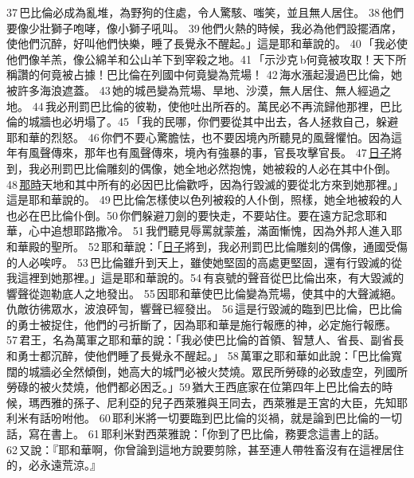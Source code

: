 37 巴比倫必成為亂堆，為野狗的住處，令人驚駭、嗤笑，並且無人居住。 38 他們要像少壯獅子咆哮，像小獅子吼叫。 39 他們火熱的時候，我必為他們設擺酒席，使他們沉醉，好叫他們快樂，睡了長覺永不醒起。」這是耶和華說的。 40 「我必使他們像羊羔，像公綿羊和公山羊下到宰殺之地。41 「示沙克 b何竟被攻取！天下所稱讚的何竟被占據！巴比倫在列國中何竟變為荒場！ 42 海水漲起漫過巴比倫，她被許多海浪遮蓋。 43 她的城邑變為荒場、旱地、沙漠，無人居住、無人經過之地。 44 我必刑罰巴比倫的彼勒，使他吐出所吞的。萬民必不再流歸他那裡，巴比倫的城牆也必坍塌了。45 「我的民哪，你們要從其中出去，各人拯救自己，躲避耶和華的烈怒。 46 你們不要心驚膽怯，也不要因境內所聽見的風聲懼怕。因為這年有風聲傳來，那年也有風聲傳來，境內有強暴的事，官長攻擊官長。 47 \underline{日子}將到，我必刑罰巴比倫雕刻的偶像，她全地必然抱愧，她被殺的人必在其中仆倒。 48 \underline{那時}天地和其中所有的必因巴比倫歡呼，因為行毀滅的要從北方來到她那裡。」這是耶和華說的。 49 巴比倫怎樣使以色列被殺的人仆倒，照樣，她全地被殺的人也必在巴比倫仆倒。50 你們躲避刀劍的要快走，不要站住。要在遠方記念耶和華，心中追想耶路撒冷。 51 我們聽見辱罵就蒙羞，滿面慚愧，因為外邦人進入耶和華殿的聖所。 52 耶和華說：「\underline{日子}將到，我必刑罰巴比倫雕刻的偶像，通國受傷的人必唉哼。 53 巴比倫雖升到天上，雖使她堅固的高處更堅固，還有行毀滅的從我這裡到她那裡。」這是耶和華說的。54 有哀號的聲音從巴比倫出來，有大毀滅的響聲從迦勒底人之地發出。 55 因耶和華使巴比倫變為荒場，使其中的大聲滅絕。仇敵彷彿眾水，波浪砰訇，響聲已經發出。 56 這是行毀滅的臨到巴比倫，巴比倫的勇士被捉住，他們的弓折斷了，因為耶和華是施行報應的神，必定施行報應。 57 君王，名為萬軍之耶和華的說：「我必使巴比倫的首領、智慧人、省長、副省長和勇士都沉醉，使他們睡了長覺永不醒起。」 58 萬軍之耶和華如此說：「巴比倫寬闊的城牆必全然傾倒，她高大的城門必被火焚燒。眾民所勞碌的必致虛空，列國所勞碌的被火焚燒，他們都必困乏。」59 猶大王西底家在位第四年上巴比倫去的時候，瑪西雅的孫子、尼利亞的兒子西萊雅與王同去，西萊雅是王宮的大臣，先知耶利米有話吩咐他。 60 耶利米將一切要臨到巴比倫的災禍，就是論到巴比倫的一切話，寫在書上。 61 耶利米對西萊雅說：「你到了巴比倫，務要念這書上的話。 62 又說：『耶和華啊，你曾論到這地方說要剪除，甚至連人帶牲畜沒有在這裡居住的，必永遠荒涼。』




